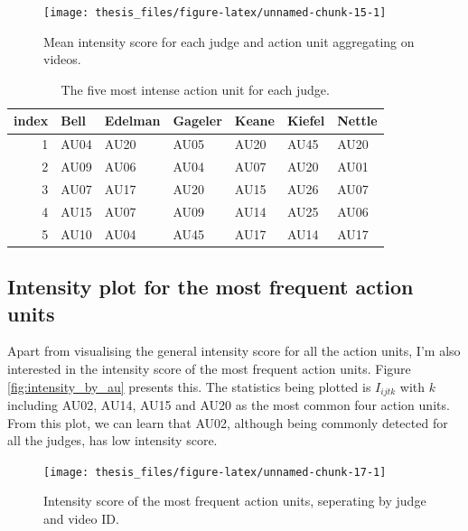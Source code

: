 \documentclass{monashthesis}
\begin{document}
\begin{figure}
\texttt{[image: thesis\_files/figure-latex/unnamed-chunk-15-1]} \caption{Mean intensity score for each judge and action unit aggregating on videos.\label{fig:mean_intensity}}\label{fig:unnamed-chunk-15}
\end{figure}

\begin{table}[t]

\caption{\label{tab:unnamed-chunk-16}\label{tab:most_intense}The five most intense action unit for each judge.}
\centering
\begin{tabular}{r|l|l|l|l|l|l}
\hline
index & Bell & Edelman & Gageler & Keane & Kiefel & Nettle\\
\hline
1 & AU04 & AU20 & AU05 & AU20 & AU45 & AU20\\
\hline
2 & AU09 & AU06 & AU04 & AU07 & AU20 & AU01\\
\hline
3 & AU07 & AU17 & AU20 & AU15 & AU26 & AU07\\
\hline
4 & AU15 & AU07 & AU09 & AU14 & AU25 & AU06\\
\hline
5 & AU10 & AU04 & AU45 & AU17 & AU14 & AU17\\
\hline
\end{tabular}
\end{table}

\hypertarget{intensity-plot-for-the-most-frequent-action-units}{%
\subsection{Intensity plot for the most frequent action units}\label{intensity-plot-for-the-most-frequent-action-units}}

Apart from visualising the general intensity score for all the action units, I'm also interested in the intensity score of the most frequent action units. Figure \ref{fig:intensity_by_au} presents this. The statistics being plotted is \(I_{ijtk}\) with \(k\) including AU02, AU14, AU15 and AU20 as the most common four action units. From this plot, we can learn that AU02, although being commonly detected for all the judges, has low intensity score.

\begin{figure}
\texttt{[image: thesis\_files/figure-latex/unnamed-chunk-17-1]} \caption{Intensity score of the most frequent action units, seperating by judge and video ID.\label{fig:intensity_by_au}}\label{fig:unnamed-chunk-17}
\end{figure}
\end{document}
